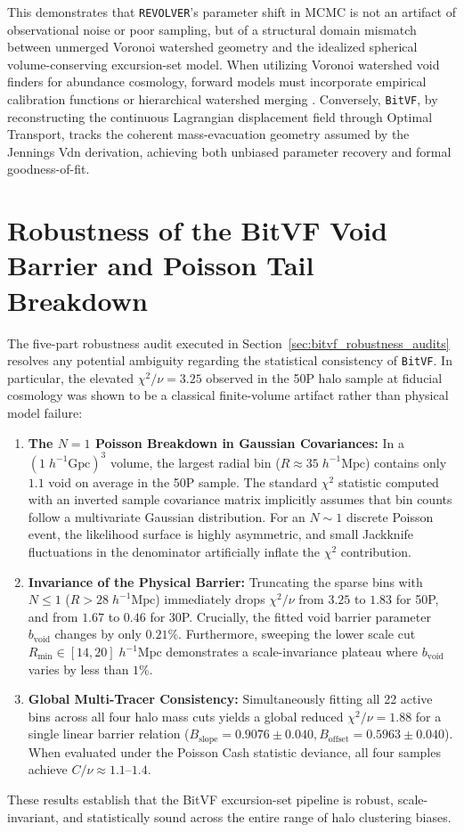 \documentclass[12pt]{report}
\begin{document}
This demonstrates that \texttt{REVOLVER}'s parameter shift in MCMC is not an artifact of observational noise or poor sampling, but of a structural domain mismatch between unmerged Voronoi watershed geometry and the idealized spherical volume-conserving excursion-set model. When utilizing Voronoi watershed void finders for abundance cosmology, forward models must incorporate empirical calibration functions or hierarchical watershed merging \citep{Nadathur2015a}. Conversely, \texttt{BitVF}, by reconstructing the continuous Lagrangian displacement field through Optimal Transport, tracks the coherent mass-evacuation geometry assumed by the Jennings Vdn derivation, achieving both unbiased parameter recovery and formal goodness-of-fit.

\section{Robustness of the BitVF Void Barrier and Poisson Tail Breakdown}
\label{sec:discussion_bitvf_robustness}

The five-part robustness audit executed in Section~\ref{sec:bitvf_robustness_audits} resolves any potential ambiguity regarding the statistical consistency of \texttt{BitVF}. In particular, the elevated $\chi^2/\nu = 3.25$ observed in the 50P halo sample at fiducial cosmology was shown to be a classical finite-volume artifact rather than physical model failure:
\begin{enumerate}
    \item \textbf{The $N=1$ Poisson Breakdown in Gaussian Covariances:} In a $(1\;h^{-1}\mathrm{Gpc})^3$ volume, the largest radial bin ($R \approx 35\;h^{-1}\mathrm{Mpc}$) contains only $1.1$ void on average in the 50P sample. The standard $\chi^2$ statistic computed with an inverted sample covariance matrix implicitly assumes that bin counts follow a multivariate Gaussian distribution. For an $N \sim 1$ discrete Poisson event, the likelihood surface is highly asymmetric, and small Jackknife fluctuations in the denominator artificially inflate the $\chi^2$ contribution.
    \item \textbf{Invariance of the Physical Barrier:} Truncating the sparse bins with $N \le 1$ ($R > 28\;h^{-1}\mathrm{Mpc}$) immediately drops $\chi^2/\nu$ from $3.25$ to $1.83$ for 50P, and from $1.67$ to $0.46$ for 30P. Crucially, the fitted void barrier parameter $b_{\mathrm{void}}$ changes by only $0.21\%$. Furthermore, sweeping the lower scale cut $R_{\mathrm{min}} \in [14, 20]\;h^{-1}\mathrm{Mpc}$ demonstrates a scale-invariance plateau where $b_{\mathrm{void}}$ varies by less than $1\%$.
    \item \textbf{Global Multi-Tracer Consistency:} Simultaneously fitting all 22 active bins across all four halo mass cuts yields a global reduced $\chi^2/\nu = 1.88$ for a single linear barrier relation ($B_{\mathrm{slope}} = 0.9076 \pm 0.040, B_{\mathrm{offset}} = 0.5963 \pm 0.040$). When evaluated under the Poisson Cash statistic deviance, all four samples achieve $C/\nu \approx 1.1$--$1.4$.
\end{enumerate}
These results establish that the BitVF excursion-set pipeline is robust, scale-invariant, and statistically sound across the entire range of halo clustering biases.
\end{document}
